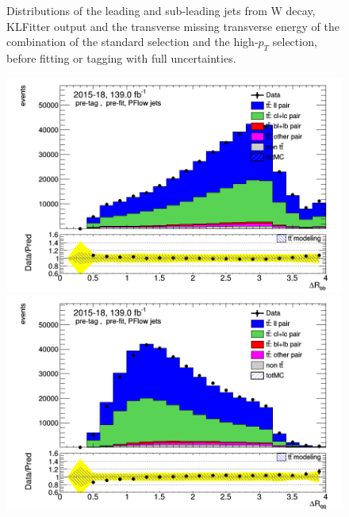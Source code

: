 \documentclass[letterpaper,12pt]{article}
\begin{document}
\begin{figure}
\begin{minipage}[b]{.45\textwidth}
\end{minipage}
\caption{Distributions of the leading and sub-leading jets from W decay, KLFitter output and the transverse missing transverse energy of the combination of the standard selection and the high-$p_T$ selection, before fitting or tagging with full uncertainties.} \label{fig:jets_PFlow}
\end{figure}




\begin{figure}
\begin{minipage}[b]{.45\textwidth}
\centering
\includegraphics[width=1\textwidth]{Oct_distributions/pretagNoRwDL1rwithhighpTPFlow_scaledall/DataMC_dRbb.png}
\end{minipage}\hfill
\begin{minipage}[b]{.45\textwidth}
\centering
\includegraphics[width=1\textwidth]{Oct_distributions/pretagNoRwDL1rwithhighpTPFlow_scaledall/DataMC_dRqq.png}
\end{minipage}\hfill

\end{figure}
\end{document}

